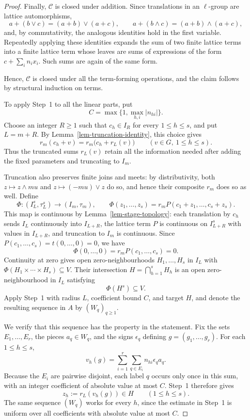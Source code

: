 \documentclass[preprint,3p]{elsarticle}
\theoremstyle{plain}
\theoremstyle{definition}
\numberwithin{equation}{section}
\begin{document}
\begin{proof}
Finally, $\mathcal C$ is closed under addition.  Since translations in an
$\ell$-group are lattice automorphisms,
\[
 a+(b\vee c)=(a+b)\vee(a+c),
 \qquad
 a+(b\wedge c)=(a+b)\wedge(a+c),
\]
and, by commutativity, the analogous identities hold in the first
variable.  Repeatedly applying these identities expands the sum of two
finite lattice terms into a finite lattice term whose leaves are sums of
expressions of the form $c+\sum_i n_i x_i$.
Such sums are again of the same form.  

Hence, $\mathcal C$ is closed under
all the term-forming operations, and the claim follows by structural
induction on terms.

To apply Step~1 to all the linear parts, put
\[
 C=\max\bigl\{1,\max_{h,i}|n_{hi}|\bigr\}.
\]
Choose an integer $R\geq1$ such that $c_h\in I_R$ for every
$1\leq h\leq s$, and put $L=m+R$.
By Lemma~\ref{lem-truncation-identity}, this choice gives
\[
 r_m(c_h+v)=r_m\bigl(c_h+r_L(v)\bigr)
 \qquad(v\in G,\ 1\leq h\leq s).
\]
Thus the truncated sums $r_L(v)$ retain all the information
needed after adding the fixed parameters and truncating to $I_m$.

Truncation also preserves finite joins and meets: by distributivity,
both $z\mapsto z\wedge mu$ and $z\mapsto(-mu)\vee z$ do so,
and hence their composite $r_m$ does so as well.
Define
\[
 \Phi\colon(I_L^s,\tau_L^s)\longrightarrow(I_m,\tau_m),
 \qquad
 \Phi(z_1,\ldots,z_s)
 =r_mP(c_1+z_1,\ldots,c_s+z_s).
\]
This map is continuous by Lemma~\ref{lem-stage-topology}:
each translation by $c_h$ sends $I_L$ continuously into $I_{L+R}$,
the lattice term $P$ is continuous on $I_{L+R}^s$ with values in
$I_{L+R}$, and truncation to $I_m$ is continuous.
Since $P(c_1,\ldots,c_s)=t(0,\ldots,0)=0$, we have
\begin{equation}
\label{eq-FBOT-initial-control}
 \Phi(0,\ldots,0)
 =r_mP(c_1,\ldots,c_s)
 =0.
\end{equation}
Continuity at zero gives open zero-neighbourhoods
$H_1,\ldots,H_s$ in $I_L$ with
$\Phi(H_1\times\cdots\times H_s)\subseteq V$.
Their intersection $H=\bigcap_{h=1}^sH_h$ is an open
zero-neighbourhood in $I_L$ satisfying
\begin{equation}
\label{eq-FBOT-target-neighbourhood}
 \Phi(H^s)\subseteq V.
\end{equation}
Apply Step~1 with radius $L$, coefficient bound $C$, and target $H$,
and denote the resulting sequence in $A$ by $(W_q)_{q\geq1}$.

We verify that this sequence has the property in the statement.
Fix the sets $E_1,\ldots,E_r$, the pieces $a_q\in W_q$, and the
signs $\epsilon_q$ defining $g=(g_1,\ldots,g_r)$.
For each $1\leq h\leq s$,
\[
 v_h(g)=\sum_{i=1}^r\sum_{q\in E_i}n_{hi}\epsilon_q a_q.
\]
Because the $E_i$ are pairwise disjoint, each label $q$ occurs
only once in this sum, with an integer coefficient of absolute
value at most $C$.  Step~1 therefore gives
\[
 z_h:=r_L(v_h(g))\in H
 \qquad(1\leq h\leq s).
\]
The same sequence $(W_q)$ works for every $h$, since the estimate
in Step~1 is uniform over all coefficients with absolute value
at most $C$.


\end{proof}
\end{document}
